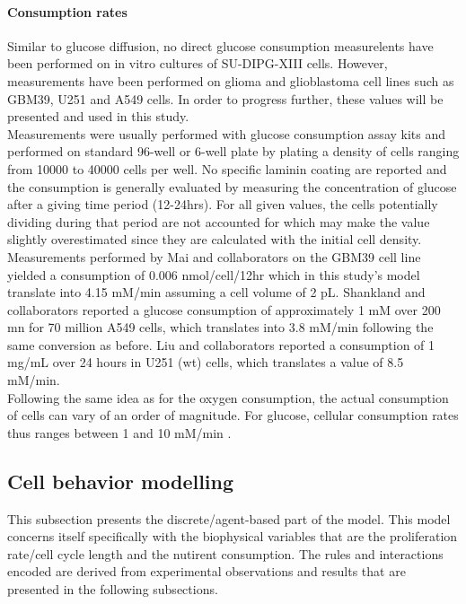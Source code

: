 \documentclass[11pt,a4paper]{article}
\begin{document}
\paragraph{Consumption rates}
Similar to glucose diffusion, no direct glucose consumption measurelents have been performed on in vitro cultures of SU-DIPG-XIII cells. However, measurements have been performed on glioma and glioblastoma cell lines such as GBM39, U251 and A549 cells. In order to progress further, these values will be presented and used in this study.\\

Measurements were usually performed with glucose consumption assay kits and performed on standard 96-well or 6-well plate by plating a density of cells ranging from 10000 to 40000 cells per well. No specific laminin coating are reported and the consumption is generally evaluated by measuring the concentration of glucose after a giving time period (12-24hrs). For all given values, the cells potentially dividing during that period are not accounted for which may make the value slightly overestimated since they are calculated with the initial cell density.\cite{Mai2017}\cite{Shankland2002}\cite{LiuFM2021}\\

Measurements performed by Mai and collaborators on the GBM39 cell line yielded a consumption of 0.006 nmol/cell/12hr which in this study's model translate into 4.15 mM/min assuming a cell volume of 2 pL.\cite{Mai2017} Shankland and collaborators reported a glucose consumption of approximately 1 mM over 200 mn for 70 million A549 cells, which translates into 3.8 mM/min following the same conversion as before. Liu and collaborators reported a consumption of 1 mg/mL over 24 hours in U251 (wt) cells, which translates a value of 8.5 mM/min.\cite{Liu2021}\\

Following the same idea as for the oxygen consumption, the actual consumption of cells can vary of an order of magnitude. For glucose, cellular consumption rates thus ranges between 1 and 10 mM/min .

\subsection{Cell behavior modelling}
This subsection presents the discrete/agent-based part of the model. This model concerns itself specifically with the biophysical variables that are the proliferation rate/cell cycle length and the nutirent consumption.  The rules and interactions encoded are derived from experimental observations and results that are presented in the following subsections. 
\end{document}
